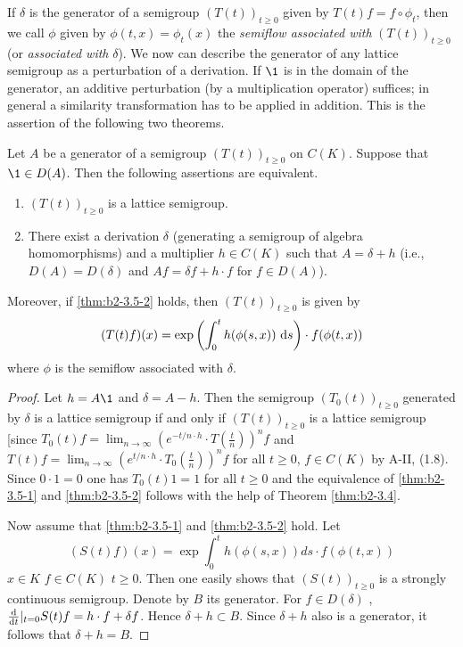 If $\delta$ is the generator of a semigroup $(T(t))_{t \geq 0}$ given by $T(t)f = f \circ \phi_{t}$, then we call $\phi$ given by $\phi(t,x) = \phi_{t}(x)$ the \emph{semiflow associated with} $(T(t))_{t \geq 0}$ (or \emph{associated with} $\delta$).
We now can describe the generator of any lattice semigroup as a perturbation of a derivation.
If $\1$ is in the domain of the generator, an additive perturbation (by a multiplication operator) suffices; in general a similarity transformation has to be applied in addition.
This is the assertion of the following two theorems.

\begin{theorem}\label{thm:b2-3.5}
Let $A$ be a generator of a semigroup $(T(t))_{t \geq 0}$ on $C(K)$.
Suppose that $\1 \in D(A)$.
Then the following assertions are equivalent.
\begin{enumerate}[\upshape (a)]
\item \label{thm:b2-3.5-1}
$(T(t))_{t \geq 0}$ is a lattice semigroup.
\item \label{thm:b2-3.5-2}
There exist a derivation $\delta$ (generating a semigroup of algebra homomorphisms) and a multiplier $h \in C(K)$ such that $A = \delta + h$ (i.e., $D(A) = D(\delta)$ and $Af = \delta f + h \cdot f$ for $f \in D(A)$).
\end{enumerate}

Moreover, if \ref{thm:b2-3.5-2} holds, then $(T(t))_{t \geq 0}$ is given by
\begin{equation}\label{eq:b2-3.6}
(T(t)f)(x) = \exp\left(\int_{0}^{t} h(\phi(s,x))\,\mathop{}\!\mathrm{d}{s}\right) \cdot f(\phi(t,x))
\end{equation}
where $\phi$ is the semiflow associated with $\delta$.
\end{theorem}

\begin{proof}
Let $h = A\1$ and $\delta = A - h$.
Then the semigroup $(T_{0}(t))_{t \geq 0}$ generated by $\delta$ is a lattice semigroup if and only if $(T(t))_{t \geq 0}$ is a lattice semigroup [since $T_{0}(t)f = \lim_{n \to \infty} (e^{-t/n \cdot h} \cdot T(\frac{t}{n}))^{n}f$ and $T(t)f = \lim_{n \to \infty} (e^{t/n \cdot h} \cdot T_{0}(\frac{t}{n}))^{n}f$ for all $t \geq 0$, $f \in C(K)$ by
A-II, (1.8).
Since $0 \cdot 1 = 0$ one has $T_{0}(t)1 = 1$ for all $t \geq 0$ and the equivalence of \ref{thm:b2-3.5-1} and \ref{thm:b2-3.5-2} follows with the help of Theorem \ref{thm:b2-3.4}.

Now assume that \ref{thm:b2-3.5-1} and \ref{thm:b2-3.5-2} hold.
Let
\[
(S(t)f) (x) = \exp \int_{0}^{t} h(\phi(s,x))ds \cdot f(\phi(t,x))
\]
$x \in K$ $f \in C (K)$ $t \geq 0$. 
Then one easily shows that $(S(t))_{t\geq 0}$ is a strongly continuous semigroup.
Denote by $B$ its generator.
For $f \in D(\delta)$ , $\frac{\mathop{}\!\mathrm{d}{}}{\mathop{}\!\mathrm{d}{t}}|_{t = 0}S(t)f = h \cdot f + \delta f$.
Hence $\delta + h \subset B$.  Since $\delta + h$ also is a generator, it follows that $\delta + h = B$.
\end{proof}


